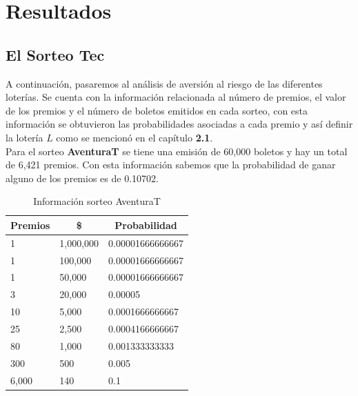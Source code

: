\chapter{Resultados}


\newpage

\section{El Sorteo Tec}


\noindent A continuación, pasaremos al análisis de aversión al riesgo de las diferentes loterías. Se cuenta con la información relacionada al número de premios, el valor de los premios y el número de boletos emitidos en cada sorteo, con esta información se obtuvieron las probabilidades asociadas a cada premio y así definir la lotería $L$ como se mencionó en el capítulo \textbf{2.1}. \\

Para el sorteo \textbf{AventuraT} se tiene una emisión de 60,000 boletos y hay un total de 6,421 premios. Con esta información sabemos que la probabilidad de ganar alguno de los premios es de 0.10702.

\begin{table}[H]
\centering
\caption{Información sorteo AventuraT}
\label{tab:avent}
\begin{tabular}{@{}lll@{}}
\toprule
\multicolumn{1}{c}{Premios} & \multicolumn{1}{c}{\$} & \multicolumn{1}{c}{Probabilidad} \\ \midrule
1                           & 1,000,000                & 0.00001666666667                 \\
1                           & 100,000                 & 0.00001666666667                 \\
1                           & 50,000                  & 0.00001666666667                 \\
3                           & 20,000                  & 0.00005                          \\
10                          & 5,000                   & 0.0001666666667                  \\
25                          & 2,500                   & 0.0004166666667                  \\
80                          & 1,000                   & 0.001333333333                   \\
300                         & 500                    & 0.005                            \\
6,000                        & 140                    & 0.1                              \\ \bottomrule
\end{tabular}
\end{table}

